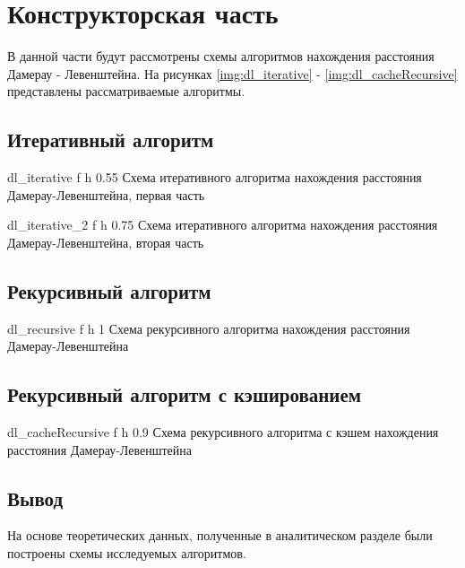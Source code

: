\chapter{Конструкторская часть}

В данной части будут рассмотрены схемы алгоритмов нахождения расстояния Дамерау - Левенштейна.
На рисунках \ref{img:dl_iterative} - \ref{img:dl_cacheRecursive} представлены рассматриваемые алгоритмы.

\section{Итеративный алгоритм}
{dl_iterative} %
{f} %
{h} %
{0.55\textwidth} %
{Схема итеративного алгоритма нахождения расстояния Дамерау-Левенштейна, первая часть} %
\clearpage

{dl_iterative_2} %
{f} %
{h} %
{0.75\textwidth} %
{Схема итеративного алгоритма нахождения расстояния Дамерау-Левенштейна, вторая часть} %
\clearpage

\section{Рекурсивный алгоритм}
{dl_recursive} %
{f} %
{h} %
{1\textwidth} %
{Схема рекурсивного алгоритма нахождения расстояния Дамерау-Левенштейна} %
\clearpage

\section{Рекурсивный алгоритм с кэшированием}
{dl_cacheRecursive} %
{f} %
{h} %
{0.9\textwidth} %
{Схема рекурсивного алгоритма с кэшем нахождения расстояния Дамерау-Левенштейна} %
\clearpage

\section*{Вывод}
На основе теоретических данных, полученные в аналитическом разделе были построены схемы исследуемых алгоритмов.

